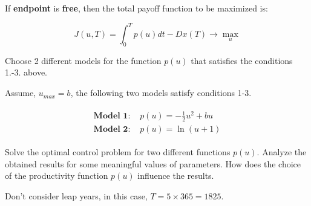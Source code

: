 \documentclass{article}
\begin{document}
If \textbf{endpoint} is \textbf{free}, then the total payoff function to be maximized is:

\begin{equation}\label{eq:optfunction_with_terminal_cost}
    J(u,T)=\int_{0}^{T}p(u)dt-Dx(T)\rightarrow \max_{u} 
\end{equation}


 Choose 2 different models for the function $p(u)$ that satisfies the conditions 1.-3. above.

Assume, $u_{max}=b$, the following two models satisfy conditions 1-3.

\begin{gather}
    \begin{aligned}
        \textbf{Model 1: } & p(u)=-\frac{1}{2}u^2+bu\\
        \textbf{Model 2: } & p(u)=\ln (u+1) 
    \end{aligned}
\end{gather}

 Solve the optimal control problem for two different functions $p(u)$. Analyze the obtained results for some meaningful values of parameters. How does the choice of the productivity function $p(u)$ influence the results.

Don't consider leap years, in this case, $T=5\times 365=1825.$
\end{document}
